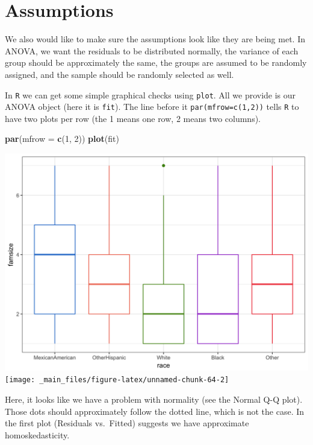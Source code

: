 \documentclass[]{tufte-book}
\newenvironment{Shaded}{}{}
\newcommand{\KeywordTok}[1]{\textcolor[rgb]{0.00,0.44,0.13}{\textbf{#1}}}
\newcommand{\DataTypeTok}[1]{\textcolor[rgb]{0.56,0.13,0.00}{#1}}
\newcommand{\DecValTok}[1]{\textcolor[rgb]{0.25,0.63,0.44}{#1}}
\newcommand{\NormalTok}[1]{#1}
\theoremstyle{definition}
\theoremstyle{definition}
\theoremstyle{remark}
\begin{document}
\section*{Assumptions}\label{assumptions}

We also would like to make sure the assumptions look like they are being
met. In ANOVA, we want the residuals to be distributed normally, the
variance of each group should be approximately the same, the groups are
assumed to be randomly assigned, and the sample should be randomly
selected as well.

In \texttt{R} we can get some simple graphical checks using
\texttt{plot}. All we provide is our ANOVA object (here it is
\texttt{fit}). The line before it \texttt{par(mfrow=c(1,2))} tells
\texttt{R} to have two plots per row (the 1 means one row, 2 means two
columns).

\begin{Shaded}
\begin{Highlighting}[]
\KeywordTok{par}\NormalTok{(}\DataTypeTok{mfrow =} \KeywordTok{c}\NormalTok{(}\DecValTok{1}\NormalTok{, }\DecValTok{2}\NormalTok{))}
\KeywordTok{plot}\NormalTok{(fit)}
\end{Highlighting}
\end{Shaded}

\includegraphics{_main_files/figure-latex/unnamed-chunk-64-1}
\texttt{[image: \_main\_files/figure-latex/unnamed-chunk-64-2]}

Here, it looks like we have a problem with normality (see the Normal Q-Q
plot). Those dots should approximately follow the dotted line, which is
not the case. In the first plot (Residuals vs.~Fitted) suggests we have
approximate homoskedasticity.
\end{document}
